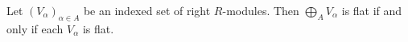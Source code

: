 Let $(V_\alpha)_{\alpha \in A}$ be an indexed set of right $R$-modules. Then $\bigoplus_A V_\alpha$ is flat if and only if each $V_\alpha$ is flat.
